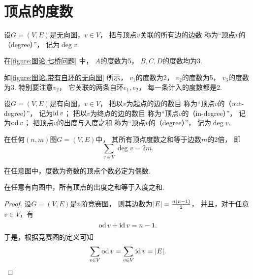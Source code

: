 \section{顶点的度数}
\begin{definition}
设\(G = (V,E)\)是无向图，\(v \in V\)，
把与顶点\(v\)关联的所有边的边数
称为“顶点\(v\)的（degree）”，
记为\(\deg v\).
\end{definition}

在\cref{figure:图论.七桥问题} 中，
\(A\)的度数为5，
\(B,C,D\)的度数均为3.

如\cref{figure:图论.带有自环的无向图} 所示，
\(v_1\)的度数为2，
\(v_2\)的度数为5，
\(v_3\)的度数为3.
特别要注意\(v_2\)，
它关联的两条自环\(e_1,e_2\)，
每一条计入的度数都是2.

\begin{definition}
设\(G = (V,E)\)是有向图，\(v \in V\)，
把以\(v\)为起点的边的数目
称为“顶点\(v\)的（out-degree）”，
记为\(\operatorname{id} v\)；
把以\(v\)为终点的边的数目
称为“顶点\(v\)的（in-degree）”，
记为\(\operatorname{od} v\)；
把顶点\(v\)的出度与入度之和
称为“顶点\(v\)的（degree）”，
记为\(\deg v\).
\end{definition}

\begin{theorem}\label{theorem:图论.握手定理}
在任何\((n,m)\)图\(G = (V,E)\)中，
其所有顶点度数之和等于边数\(m\)的2倍，
即\[
	\sum_{v \in V} \deg v = 2m.
\]
\end{theorem}

\begin{corollary}\label{theorem:图论.握手定理.推论}
在任意图中，度数为奇数的顶点个数必定为偶数.
\end{corollary}

\begin{theorem}
在任意有向图中，所有顶点的出度之和等于入度之和.
\begin{proof}
设\(G = (V,E)\)是\(n\)阶竞赛图，
则其边数为\(\abs{E} = \frac{n(n-1)}2\)，
并且，对于任意\(v \in V\)，有\[
	\operatorname{od} v + \operatorname{id} v = n-1.
\]
于是，根据竞赛图的定义可知\[
	\sum_{v \in V} \operatorname{od} v
	= \sum_{v \in V} \operatorname{id} v
	= \abs{E}.
	\qedhere
\]
\end{proof}
\end{theorem}

